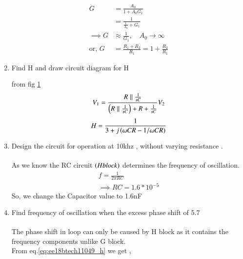 \begin{enumerate}[label=\arabic*.,ref=\theenumi]
\begin{align}
G &= \frac{A_{0}}{1+A_{0}G_{1}}
\\
&= \frac{1}{\frac{1}{A_{0}} + G_{1}}
\\
\implies G&\approx \frac{1}{G_{1}}, \quad   A_{0}\to\infty
\\
\text{or, } G &= \frac{R_{1}+R_{2}}{R_{1}}=1+\frac{R_{2}}{R_{1}}
\label{eq:ee18btech11049_G}
\end{align}


\item  Find H and draw circuit diagram for H
\\
\solution  

\begin{figure}[!ht]
	\begin{center}
		\resizebox{\columnwidth}{!}{}
	\end{center}
\caption{}
\label{fig:ee18btech11049_h_block}
\end{figure}

from fig \ref{fig:ee18btech11049_h_block} 
\begin{align}
    V_1 = \frac{R \parallel \frac{1}{sC}}{\left(R \parallel \frac{1}{sC}\right) + R + \frac{1}{sC}} V_2
\end{align}
\begin{align}
    H = \frac{1}{3+j\brak{\omega CR - 1/\omega CR}}
    \label{eq:ee18btech11049_h}
\end{align}

\item Design the circuit for operation at 10khz , without varying resistance .
\\
\\
\solution  As we know the RC circuit $\left(H block\right)$ determines the frequency of oscillation.
\begin{align}
    f = \frac{1}{2\pi RC}\\
    \implies RC = 1.6 * 10^{-5}
    \label{eq:ee_cap}
\end{align}
So, we change the Capacitor value to 1.6nF \\




\item Find frequency of oscillation when the excess phase shift  of 5.7\degree
\\ \\
\solution  The phase shift in loop can only be caused by H block as it contains the frequency components unlike G block. \\
From eq.\ref{eq:ee18btech11049_h} we get ,




\end{enumerate}
